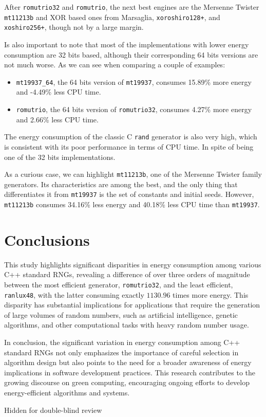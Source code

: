 \documentclass[dvipsnames,format=sigconf,anonymous=true,review=true]{acmart}
\begin{document}
After \texttt{romutrio32} and \texttt{romutrio}, the next best engines are the Mersenne Twister \texttt{mt11213b} and XOR based ones from Marsaglia, \texttt{xoroshiro128+}, and \texttt{xoshiro256+}, though not by a large margin.

Is also important to note that most of the implementations with lower energy consumption are 32 bits based, although their corresponding 64 bits versions are not much worse. As we can see when comparing a couple of examples:
\begin{itemize}
\item \texttt{mt19937\_64}, the 64 bits version of \texttt{mt19937}, consumes 15.89\% more energy and -4.49\% less CPU time.
\item \texttt{romutrio}, the 64 bits version of \texttt{romutrio32}, consumes 4.27\% more energy and 2.66\% less CPU time.
\end{itemize}

The energy consumption of the classic C \texttt{rand} generator is also very high, which is consistent with its poor performance in terms of CPU time. In spite of being one of the 32 bits implementations.

As a curious case, we can highlight \texttt{mt11213b}, one of the Mersenne Twister family generators. Its characteristics are among the best, and the only thing that differentiates it from \texttt{mt19937} is the set of constants and initial seeds. However, \texttt{mt11213b} consumes 34.16\% less energy and 40.18\% less CPU time than \texttt{mt19937}.

\section{Conclusions}
\label{sec:conclusions}

This study highlights significant disparities in energy consumption among various C++ standard RNGs, revealing a difference of over three orders of magnitude between the most efficient generator, \texttt{romutrio32}, and the least efficient, \texttt{ranlux48}, with the latter consuming exactly $1130.96$ times more energy. This disparity has substantial implications for applications that require the generation of large volumes of random numbers, such as artificial intelligence, genetic algorithms, and other computational tasks with heavy random number usage.

In conclusion, the significant variation in energy consumption among C++ standard RNGs not only emphasizes the importance of careful selection in algorithm design but also points to the need for a broader awareness of energy implications in software development practices. This research contributes to the growing discourse on green computing, encouraging ongoing efforts to develop energy-efficient algorithms and systems.

\begin{acks}
Hidden for double-blind review
\end{acks}



\end{document}
